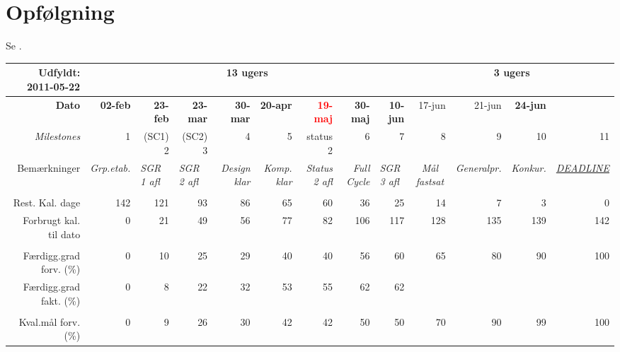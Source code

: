 \section{Opfølgning}
Se .
\begin{sidewaystable}[!htbp]
\begin{scriptsize}
    \begin{tabular}{r|rrrrrrrr|rrrr}
Udfyldt: 2011-05-22    & \multicolumn{8}{c|}{13 ugers} & \multicolumn{4}{c}{3 ugers} \\ \hline
    \textbf{Dato} & \textbf{02-feb} & \textbf{23-feb} & \textbf{23-mar} & \textbf{30-mar} & \textbf{20-apr} & \textcolor{red}{\textbf{19-maj}} & \textbf{30-maj} & \textbf{10-jun} & 17-jun & 21-jun & \textbf{24-jun} \\
    \textit{Milestones} & 1     & (SC1) 2 & (SC2) 3 & 4     & 5     & status 2 & 6     & 7     & 8     & 9     & 10    & 11 \\
    Bemærkninger & \textit{Grp.etab.} & \multicolumn{1}{l}{\textit{SGR 1 afl}} & \multicolumn{1}{l}{\textit{SGR 2 afl}} & \textit{Design klar} & \textit{Komp. klar} & \textit{Status 2 afl} & \textit{Full Cycle} & \multicolumn{1}{l|}{\textit{SGR 3 afl}} & \multicolumn{1}{c}{\textit{Mål fastsat}} & \multicolumn{1}{c}{\textit{Generalpr.}} & \multicolumn{1}{c}{\textit{Konkur.}} & \multicolumn{1}{c}{\textit{\underline{DEADLINE}}} \\
          &       &       &       &       &       &       &       & & & & &  \\
    Rest. Kal. dage & 142   & 121   & 93    & 86    & 65    & 60    & 36    & 25    & 14    & 7     & 3     & 0 \\
    Forbrugt kal. til dato & 0     & 21    & 49    & 56    & 77    & 82    & 106    & 117   & 128   & 135   & 139   & 142 \\
          &       &       &       &       &       &       &       &       &       &       &  \\
    Færdigg.grad forv. (\%) & 0     & 10    & 25    & 29    & 40    & 40    & 56    & 60    & 65    & 80    & 90   & 100  \\
    Færdigg.grad fakt. (\%) & 0     & 8     & 22    & 32    & 53    & 55    & 62    & 62    &       &       &   \\
          &       &       &       &       &       &       &       &       &       &       &  \\
    Kval.mål forv. (\%) & 0     & 9    & 26    & 30    & 42    & 42    & 50    & 50    & 70    & 90    & 99  & 100 \\

\end{tabular}
\end{scriptsize}
\end{sidewaystable}
